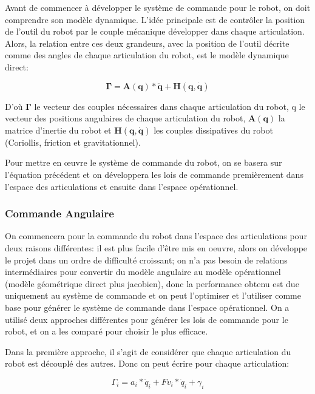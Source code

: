 \label{Comm_Ang_e_Cart}
Avant de commencer à développer le système de commande pour le robot, on doit comprendre son modèle dynamique. L'idée principale est de contrôler la position de l'outil du robot par le couple mécanique développer dans chaque articulation. Alors, la relation entre ces deux grandeurs, avec la position de l'outil décrite comme des angles de chaque articulation du robot, est le modèle dynamique direct:


	\begin{equation}
		\bm{\Gamma} = \bm{A}(\bm{q})*\ddot{\bm{q}}+\bm{H}(\bm{q},\dot{\bm{q}})
	\end{equation}

D'où $ \bm{\Gamma} $ le vecteur des couples nécessaires dans chaque articulation du robot, q le vecteur des positions angulaires de chaque articulation du robot, $ \bm{A}(\bm{q}) $ la matrice d'inertie du robot et $ \bm{H}(\bm{q},\dot{\bm{q}}) $ les couples dissipatives du robot (Coriollis, friction et gravitationnel).

Pour mettre en œuvre le système de commande du robot, on se basera sur l'équation précédent et on développera les lois de commande premièrement dans l'espace des articulations et ensuite dans l'espace opérationnel.
\subsubsection{Commande Angulaire}\label{Comm_Ang}

On commencera pour la commande du robot dans l'espace des articulations pour deux raisons différentes: il est plus facile d'être mis en oeuvre, alors on développe le projet dans un ordre de difficulté croissant; on n'a pas besoin de relations intermédiaires pour convertir du modèle angulaire au modèle opérationnel (modèle géométrique direct plus jacobien), donc la performance obtenu est due uniquement au système de commande et on peut l'optimiser et l'utiliser comme base pour générer le système de commande dans l'espace opérationnel. On a utilisé deux approches différentes pour générer les lois de commande pour le robot, et on a les comparé pour choisir le plus efficace.

Dans la première approche, il s'agit de considérer que chaque articulation du robot est découplé des autres. Donc on peut écrire pour chaque articulation:

\begin{equation}
	\Gamma_i =  a_i*\ddot{q}_i+Fv_i*\dot{q}_i+\gamma_i
\end{equation}

